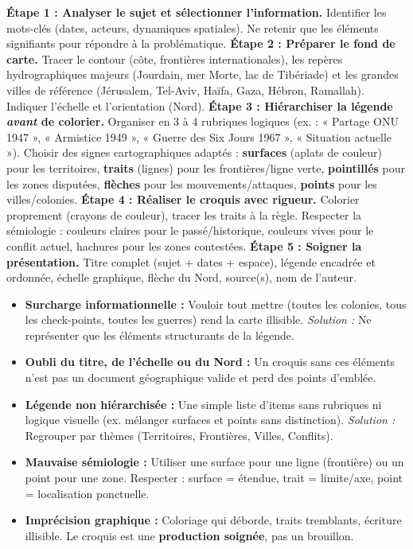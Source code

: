 \documentclass[11pt]{article}
\begin{document}
\begin{methode}
\textbf{Étape 1 : Analyser le sujet et sélectionner l'information.} Identifier les mots-clés (dates, acteurs, dynamiques spatiales). Ne retenir que les éléments signifiants pour répondre à la problématique.
\textbf{Étape 2 : Préparer le fond de carte.} Tracer le contour (côte, frontières internationales), les repères hydrographiques majeurs (Jourdain, mer Morte, lac de Tibériade) et les grandes villes de référence (Jérusalem, Tel-Aviv, Haïfa, Gaza, Hébron, Ramallah). Indiquer l'échelle et l'orientation (Nord).
\textbf{Étape 3 : Hiérarchiser la légende \textit{avant} de colorier.} Organiser en 3 à 4 rubriques logiques (ex. : « Partage ONU 1947 », « Armistice 1949 », « Guerre des Six Jours 1967 », « Situation actuelle »). Choisir des signes cartographiques adaptés : \textbf{surfaces} (aplats de couleur) pour les territoires, \textbf{traits} (lignes) pour les frontières/ligne verte, \textbf{pointillés} pour les zones disputées, \textbf{flèches} pour les mouvements/attaques, \textbf{points} pour les villes/colonies.
\textbf{Étape 4 : Réaliser le croquis avec rigueur.} Colorier proprement (crayons de couleur), tracer les traits à la règle. Respecter la sémiologie : couleurs claires pour le passé/historique, couleurs vives pour le conflit actuel, hachures pour les zones contestées.
\textbf{Étape 5 : Soigner la présentation.} Titre complet (sujet + dates + espace), légende encadrée et ordonnée, échelle graphique, flèche du Nord, source(s), nom de l'auteur.
\end{methode}

\begin{attention}
\begin{itemize}
    \item \textbf{Surcharge informationnelle :} Vouloir tout mettre (toutes les colonies, tous les check-points, toutes les guerres) rend la carte illisible. \textit{Solution :} Ne représenter que les éléments structurants de la légende.
    \item \textbf{Oubli du titre, de l'échelle ou du Nord :} Un croquis sans ces éléments n'est pas un document géographique valide et perd des points d'emblée.
    \item \textbf{Légende non hiérarchisée :} Une simple liste d'items sans rubriques ni logique visuelle (ex. mélanger surfaces et points sans distinction). \textit{Solution :} Regrouper par thèmes (Territoires, Frontières, Villes, Conflits).
    \item \textbf{Mauvaise sémiologie :} Utiliser une surface pour une ligne (frontière) ou un point pour une zone. Respecter : surface = étendue, trait = limite/axe, point = localisation ponctuelle.
    \item \textbf{Imprécision graphique :} Coloriage qui déborde, traits tremblants, écriture illisible. Le croquis est une \textbf{production soignée}, pas un brouillon.
\end{itemize}
\end{attention}
\end{document}
